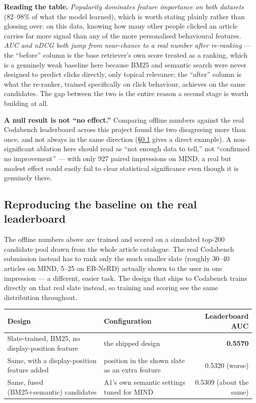 \documentclass[11pt,a4paper]{article}
\begin{document}
\textbf{Reading the table.} \emph{Popularity dominates feature importance on both datasets}
(82--98\% of what the model learned), which is worth stating plainly rather than glossing over: on
this data, knowing how many other people clicked an article carries far more signal than any of
the more personalised behavioural features. \emph{AUC and nDCG both jump from near-chance to a
real number after re-ranking} --- the ``before'' column is the base retriever's own score treated
as a ranking, which is a genuinely weak baseline here because BM25 and semantic search were never
designed to predict clicks directly, only topical relevance; the ``after'' column is what the
re-ranker, trained specifically on click behaviour, achieves on the same candidates. The gap
between the two is the entire reason a second stage is worth building at all.

\textbf{A null result is not ``no effect.''} Comparing offline numbers against the real Codabench
leaderboard across this project found the two disagreeing more than once, and not always in the
same direction (\S\ref{sec:leaderboard} gives a direct example). A non-significant ablation here
should read as ``not enough data to tell,'' not ``confirmed no improvement'' --- with only 927
paired impressions on MIND, a real but modest effect could easily fail to clear statistical
significance even though it is genuinely there.

\subsection{Reproducing the baseline on the real leaderboard}
\label{sec:leaderboard}

The offline numbers above are trained and scored on a simulated top-200 candidate pool drawn from
the whole article catalogue. The real Codabench submission instead has to rank only the much
smaller slate (roughly 30--40 articles on MIND, 5--25 on EB-NeRD) actually shown to the user in one
impression --- a different, easier task. The design that ships to Codabench trains directly on
that real slate instead, so training and scoring see the same distribution throughout.

\begin{center}
\begin{tabular}{@{}p{6.3cm}p{6.1cm}r@{}}
\toprule
\textbf{Design} & \textbf{Configuration} & \textbf{Leaderboard AUC} \\
\midrule
Slate-trained, BM25, no display-position feature & the shipped design & \textbf{0.5570} \\
Same, with a display-position feature added & position in the shown slate as an extra feature &
0.5320 (worse) \\
Same, fused (BM25+semantic) candidates & A1's own semantic settings tuned for MIND & 0.5309 (about the same) \\
\bottomrule
\end{tabular}
\end{center}
\end{document}
